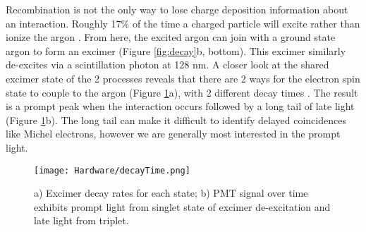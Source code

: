 \par Recombination is not the only way to lose charge deposition information about an interaction. Roughly 17\% of the time a charged particle will excite rather than ionize the argon \cite{bib:sorel}. From here, the excited argon can join with a ground state argon to form an excimer (Figure \ref{fig:decay}b, bottom). This excimer similarly de-excites via a scintillation photon at 128 nm.  A closer look at the shared excimer state of the 2 processes reveals that there are 2 ways for the electron spin state to couple to the argon (Figure \ref{fig:light}a), with 2 different decay times \cite{bib:lumin}. The result is a prompt peak when the interaction occurs followed by a long tail of late light (Figure \ref{fig:light}b).  The long tail can make it difficult to identify delayed coincidences like Michel electrons, however we are generally most interested in the prompt light. 
\begin{figure}[h!]
\centering
{}
\hspace{2 mm}
\texttt{[image: Hardware/decayTime.png]}
\caption{ a) Excimer decay rates for each state; b) PMT signal over time exhibits prompt light from singlet state of excimer de-excitation and late light from triplet. } 
\label{fig:light}
\end{figure}


